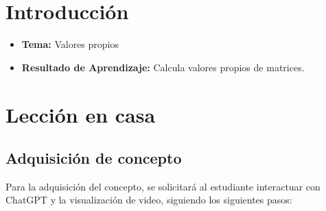 \documentclass[a4,11pt]{aleph-notas}
\begin{document}
\encabezado

\vspace*{-10mm}
\section*{Introducción}

\begin{itemize}
    \item \textbf{Tema:} Valores propios
    \item \textbf{Resultado de Aprendizaje:} Calcula valores propios de matrices.
\end{itemize}

\section{Lección en casa}

\subsection{Adquisición de concepto}

Para la adquisición del concepto, se solicitará al estudiante interactuar con ChatGPT y la visualización de video, siguiendo los siguientes pasos:
\end{document}
